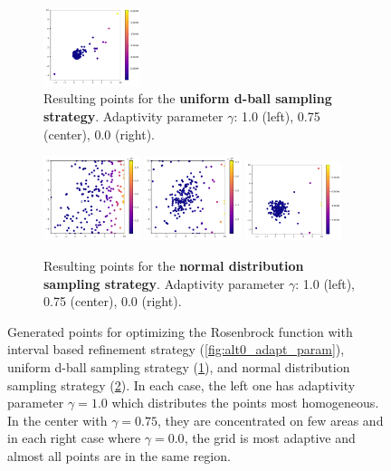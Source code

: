 \begin{figure}[H]
\begin{subfigure}{\textwidth}
		\includegraphics[width=0.31\textwidth]{figures/Adaptive_random/Adaptivity_parameter/Alternative_1_adapt_0.0_1_}
		\caption{ Resulting points for the \textbf{uniform d-ball sampling strategy}. Adaptivity parameter $ \gamma $: 1.0 (left), 0.75 (center), 0.0 (right). }
		\label{fig:alt1_adapt_param}
	\end{subfigure}
	\begin{subfigure}{\textwidth}
		\centering
		\includegraphics[width=0.31\textwidth]{figures/Adaptive_random/Adaptivity_parameter/Alternative_2_adapt_1.0_2_}
		\includegraphics[width=0.31\textwidth]{figures/Adaptive_random/Adaptivity_parameter/Alternative_2_adapt_0.75}
		\includegraphics[width=0.31\textwidth]{figures/Adaptive_random/Adaptivity_parameter/Alternative_2_adapt_0.0_2_}
		\caption{ Resulting points for the \textbf{normal distribution sampling strategy}. Adaptivity parameter $ \gamma $: 1.0 (left), 0.75 (center), 0.0 (right). }
		\label{fig:alt2_adapt_param}
	\end{subfigure}
	
	\caption{ Generated points for optimizing the Rosenbrock function with interval based refinement strategy (\ref{fig:alt0_adapt_param}), uniform d-ball sampling strategy (\ref{fig:alt1_adapt_param}), and normal distribution sampling strategy (\ref{fig:alt2_adapt_param}). In each case, the left one has adaptivity parameter $ \gamma = 1.0 $ which distributes the points most homogeneous. In the center with $ \gamma = 0.75 $, they are concentrated on few areas and in each right case where $ \gamma = 0.0 $, the grid is most adaptive and almost all points are in the same region. }
	\label{fig:Adapt_param_alternatives}
\end{figure}

